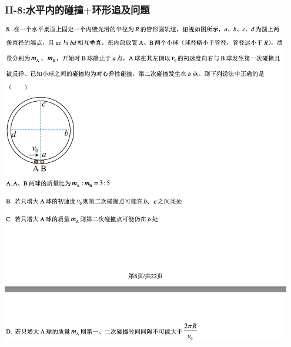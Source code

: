 \documentclass{article}
\begin{document}
\vspace{2em}

\subsubsection{II-8:水平内的碰撞+环形追及问题}
\includegraphics[width=0.95\textwidth,keepaspectratio]{./pictures/1.2-3.png}
\end{document}
